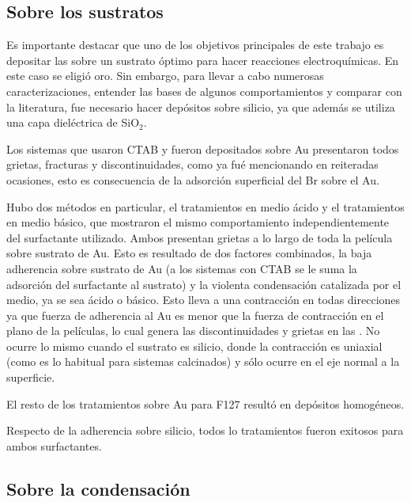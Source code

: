 { 	\subsection{Sobre los sustratos}
	
		Es importante destacar que uno de los objetivos principales de este trabajo es depositar las \pdm\space sobre un sustrato óptimo para hacer reacciones electroquímicas. En este caso se eligió oro. Sin embargo, para llevar a cabo numerosas caracterizaciones, entender las bases de algunos comportamientos y comparar con la literatura, fue necesario hacer depósitos sobre silicio, ya que además se utiliza una capa dieléctrica de SiO$_2$.

		Los sistemas que usaron CTAB y fueron depositados sobre Au presentaron todos grietas, fracturas y discontinuidades, como ya fué mencionando en reiteradas ocasiones, esto es consecuencia de la adsorción superficial del Br sobre el Au. 

		Hubo dos métodos en particular, el tratamientos en medio ácido y el tratamientos en medio básico, que mostraron el mismo comportamiento independientemente del surfactante utilizado. Ambos presentan grietas a lo largo de toda la película sobre sustrato de Au. Esto es resultado de dos factores combinados, la baja adherencia sobre sustrato de Au (a los sistemas con CTAB se le suma la adsorción del surfactante al sustrato) y la violenta condensación catalizada por el medio, ya se sea ácido o básico. Esto lleva a una contracción en todas direcciones ya que fuerza de adherencia al Au es menor que la fuerza de contracción en el plano de la películas, lo cual genera las discontinuidades y grietas en las \pdm. No ocurre lo mismo cuando el sustrato es silicio, donde la contracción es uniaxial (como es lo habitual para sistemas calcinados) y sólo ocurre en el eje normal a la superficie.

		El resto de los tratamientos sobre Au para F127 resultó en depósitos homogéneos.

		Respecto de la adherencia sobre silicio, todos lo tratamientos fueron exitosos para ambos surfactantes.

    \subsection{Sobre la condensación}	
	
}

